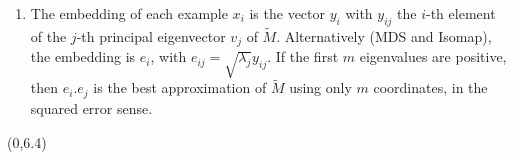 \documentclass[a0,portrait]{a0poster}
\begin{document}
\begin{textblock}{12}
{\begin{minipage}{35.85cm}
{\begin{enumerate}
\item 
  
  The embedding of each example $x_i$ is the vector $y_i$ with $y_{ij}$ the
  $i$-th element of the $j$-th principal eigenvector $v_j$ of $\tilde{M}$.
  Alternatively (MDS and Isomap), the embedding is $e_i$, with $e_{ij} =
  \sqrt{\lambda_j} y_{ij}$.  If the first $m$ eigenvalues are positive,
  then $e_i . e_j$ is the best approximation of $\tilde{M}$ using only $m$
  coordinates, in the squared error sense.

\end{enumerate}
}
       \vspace{1cm}
     \end{minipage}
     \hspace{1cm}
   }
 \end{textblock}



\begin{textblock}{12}(0,6.4)

\end{textblock}
 
\end{document}
